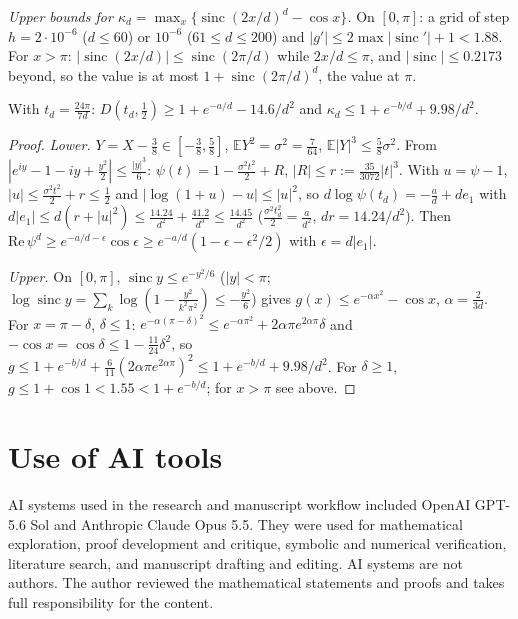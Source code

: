 \documentclass[11pt]{amsart}
\theoremstyle{definition}\newtheorem{definition}[theorem]{Definition}\theoremstyle{remark}\newtheorem{remark}[theorem]{Remark}
\newcommand{\sinc}{\operatorname{sinc}}\newcommand{\E}{\mathbb E}\newcommand{\cx}{\le_{\mathrm{cx}}}
\begin{document}
\emph{Upper bounds for $\kappa_d=\max_x\{\sinc(2x/d)^d-\cos x\}$.} On $[0,\pi]$: a grid of step $h=2\cdot10^{-6}$ ($d\le60$) or $10^{-6}$ ($61\le d\le200$) and $|g'|\le2\max|\sinc'|+1<1.88$. For $x>\pi$: $|\sinc(2x/d)|\le\sinc(2\pi/d)$ while
$2x/d\le\pi$, and $|\sinc|\le0.2173$ beyond, so the value is at most $1+\sinc(2\pi/d)^d$, the value at $\pi$.
\begin{lemma}\label{lem:tail}
With $t_d=\frac{24\pi}{7d}$: $D(t_d,\frac12)\ge1+e^{-a/d}-14.6/d^2$ and $\kappa_d\le1+e^{-b/d}+9.98/d^2$.
\end{lemma}
\begin{proof}\emph{Lower.} $Y=X-\frac38\in[-\frac38,\frac58]$, $\E Y^2=\sigma^2=\frac7{64}$, $\E|Y|^3\le\frac58\sigma^2$. From $|e^{iy}-1-iy+\frac{y^2}2|\le\frac{|y|^3}6$: $\psi(t)=1-\frac{\sigma^2t^2}2+R$,
$|R|\le r:=\frac{35}{3072}|t|^3$. With $u=\psi-1$, $|u|\le\frac{\sigma^2t^2}2+r\le\frac12$ and $|\log(1+u)-u|\le|u|^2$, so $d\log\psi(t_d)=-\frac ad+de_1$ with $d|e_1|\le d(r+|u|^2)\le\frac{14.24}{d^2}+\frac{41.2}{d^3}\le\frac{14.45}{d^2}$
($\frac{\sigma^2t_d^2}2=\frac a{d^2}$, $dr=14.24/d^2$). Then $\mathrm{Re}\,\psi^d\ge e^{-a/d-\epsilon}\cos\epsilon\ge e^{-a/d}(1-\epsilon-\epsilon^2/2)$ with $\epsilon=d|e_1|$.

\emph{Upper.} On $[0,\pi]$, $\sinc y\le e^{-y^2/6}$ ($|y|<\pi$; $\log\sinc y=\sum_k\log(1-\frac{y^2}{k^2\pi^2})\le-\frac{y^2}6$) gives $g(x)\le e^{-\alpha x^2}-\cos x$, $\alpha=\frac2{3d}$. For $x=\pi-\delta$,
$\delta\le1$: $e^{-\alpha(\pi-\delta)^2}\le e^{-\alpha\pi^2}+2\alpha\pi e^{2\alpha\pi}\delta$ and $-\cos x=\cos\delta\le1-\frac{11}{24}\delta^2$, so $g\le1+e^{-b/d}+\frac6{11}(2\alpha\pi e^{2\alpha\pi})^2\le1+e^{-b/d}+9.98/d^2$. For
$\delta\ge1$, $g\le1+\cos1<1.55<1+e^{-b/d}$; for $x>\pi$ see above.\end{proof}

\section*{Use of AI tools}
AI systems used in the research and manuscript workflow included OpenAI GPT-5.6 Sol and Anthropic Claude Opus 5.5. They were used for
mathematical exploration, proof development and critique, symbolic and numerical verification, literature search, and manuscript drafting
and editing. AI systems are not authors. The author reviewed the mathematical statements and proofs and takes full responsibility for the
content.
\end{document}
